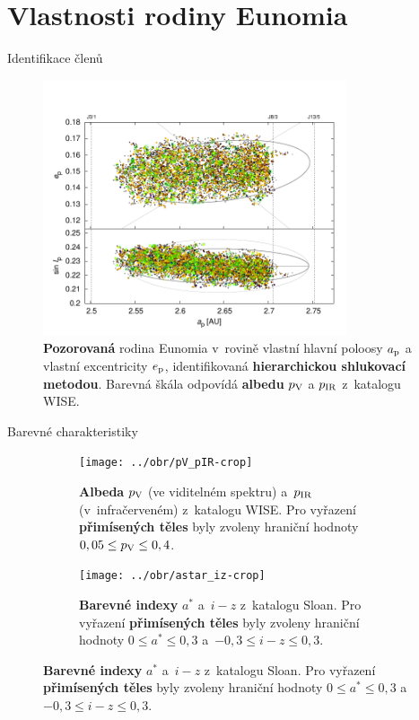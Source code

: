 \documentclass[xcolor=dvipsnames]{beamer}
\begin{document}
\section{Vlastnosti rodiny Eunomia}


\begin{frame}[t]{\secname}{Identifikace členů}
	\vspace{-1cm}
	\begin{figure}
		\centering
		\includegraphics[width=0.8\textwidth]{../obr/ae_ai_wise}
		\vspace{-0.3cm}
		\caption{\footnotesize{\textbf{Pozorovaná} rodina Eunomia v~rovině vlastní hlavní poloosy $a_{\rm p}$ a vlastní excentricity $e_{\rm p}$, identifikovaná \textbf{hierarchickou shlukovací metodou}. Barevná škála odpovídá \textbf{albedu} $p_{\rm V}$ a $p_{\rm IR}$ z~katalogu WISE\@.}}
	\end{figure}
\end{frame}

\begin{frame}[t]{\secname}{Barevné charakteristiky}
	\begin{figure}
	\captionsetup[subfigure]{justification=centering}
		\begin{subfigure}[c]{0.49\textwidth}
			\centering
			\texttt{[image: ../obr/pV\_pIR-crop]}
			\caption{\textbf{Albeda} $p_{\rm V}$ (ve viditelném spektru) a~$p_{\rm IR}$ (v~infračerveném) z~katalogu WISE. Pro vyřazení \textbf{přimísených těles} byly zvoleny hraniční hodnoty $0,05 \leq p_{\rm V} \leq 0,4$.}
		\end{subfigure}
		\begin{subfigure}[c]{0.49\textwidth}
			\centering
			\texttt{[image: ../obr/astar\_iz-crop]}
			\caption{\textbf{Barevné indexy} $a^*$ a~$i-z$ z~katalogu Sloan. Pro vyřazení \textbf{přimísených těles} byly zvoleny hraniční hodnoty $0\leq a^* \leq 0,3$ a~$-0,3\leq i-z \leq 0,3$.}
		\end{subfigure}

	\end{figure}
\end{frame}
\end{document}
